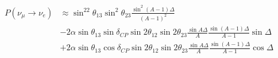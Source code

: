 
\begin{equation*}
  \begin{aligned}
    P(\nu_\mu\rightarrow\nu_e) &\approx \sin^22\theta_{13}\sin^2\theta_{23}\frac{\sin^2(A-1)\Delta}{(A-1)^2} \\
    &- 2\alpha\sin\theta_{13}\sin\delta_{CP}\sin2\theta_{12}\sin2\theta_{23}\frac{\sin A\Delta}{A}\frac{\sin(A-1)\Delta}{A-1}\sin\Delta\\
    &+ 2\alpha\sin\theta_{13}\cos\delta_{CP}\sin2\theta_{12}\sin2\theta_{23}\frac{\sin A\Delta}{A}\frac{\sin(A-1)\Delta}{A-1}\cos\Delta
  \end{aligned}
\end{equation*}
